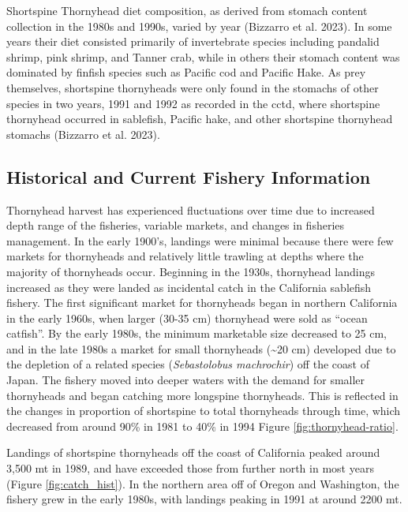\documentclass[11pt,
  english,
  letterpaper,
]{article}
\begin{document}
Shortspine Thornyhead diet composition, as derived from stomach content collection in the 1980s and 1990s, varied by year (Bizzarro et al. 2023). In some years their diet consisted primarily of invertebrate species including pandalid shrimp, pink shrimp, and Tanner crab, while in others their stomach content was dominated by finfish species such as Pacific cod and Pacific Hake. As prey themselves, shortspine thornyheads were only found in the stomachs of other species in two years, 1991 and 1992 as recorded in the \gls{cctd}, where shortspine thornyhead occurred in sablefish, Pacific hake, and other shortspine thornyhead stomachs (Bizzarro et al. 2023).

\hypertarget{historical-and-current-fishery-information}{%
\subsection{Historical and Current Fishery Information}\label{historical-and-current-fishery-information}}

Thornyhead harvest has experienced fluctuations over time due to increased depth range of the fisheries, variable markets, and changes in fisheries management. In the early 1900's, landings were minimal because there were few markets for thornyheads and relatively little trawling at depths where the majority of thornyheads occur. Beginning in the 1930s, thornyhead landings increased as they were landed as incidental catch in the California sablefish fishery. The first significant market for thornyheads began in northern California in the early 1960s, when larger (30-35 cm) thornyhead were sold as ``ocean catfish''. By the early 1980s, the minimum marketable size decreased to 25 cm, and in the late 1980s a market for small thornyheads (\textasciitilde20 cm) developed due to the depletion of a related species (\emph{Sebastolobus machrochir}) off the coast of Japan. The fishery moved into deeper waters with the demand for smaller thornyheads and began catching more longspine thornyheads. This is reflected in the changes in proportion of shortspine to total thornyheads through time, which decreased from around 90\% in 1981 to 40\% in 1994 Figure \ref{fig:thornyhead-ratio}.

Landings of shortspine thornyheads off the coast of California peaked around 3,500 mt in 1989, and have exceeded those from further north in most years (Figure \ref{fig:catch_hist}). In the northern area off of Oregon and Washington, the fishery grew in the early 1980s, with landings peaking in 1991 at around 2200 mt.
\end{document}
